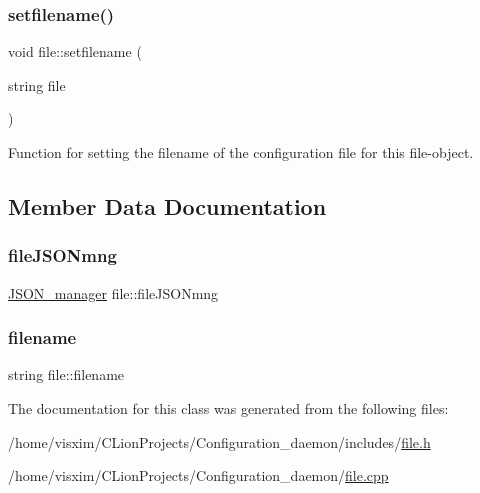 \subsubsection{\texorpdfstring{setfilename()}{setfilename()}}
{\footnotesize\ttfamily void file\+::setfilename (\begin{DoxyParamCaption}\item[{string}]{file }\end{DoxyParamCaption})}



Function for setting the filename of the configuration file for this file-\/object. 



\subsection{Member Data Documentation}
\mbox{\label{classfile_aaba2c5a6566d9cbbc9fb613475eb1ce7}} 
\subsubsection{\texorpdfstring{file\+J\+S\+O\+Nmng}{fileJSONmng}}
{\footnotesize\ttfamily \hyperlink{classJSON__manager}{J\+S\+O\+N\+\_\+manager} file\+::file\+J\+S\+O\+Nmng}

\mbox{\label{classfile_a9117ee5ddda3538f631fe96252de70fc}} 
\subsubsection{\texorpdfstring{filename}{filename}}
{\footnotesize\ttfamily string file\+::filename\hspace{0.3cm}{\ttfamily [private]}}



The documentation for this class was generated from the following files\+:\begin{DoxyCompactItemize}
\item 
/home/visxim/\+C\+Lion\+Projects/\+Configuration\+\_\+daemon/includes/\hyperlink{file_8h}{file.\+h}\item 
/home/visxim/\+C\+Lion\+Projects/\+Configuration\+\_\+daemon/\hyperlink{file_8cpp}{file.\+cpp}\end{DoxyCompactItemize}
